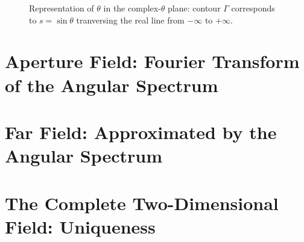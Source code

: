 \begin{figure}[htbp]
	\begin{center}
	\end{center}
	\caption{Representation of $\theta$ in the complex-$\theta$ plane: contour $\Gamma$ corresponds to $s=\sin\theta$ tranversing the real line from $-\infty$ to $+\infty$.}
	\label{fig:cplxt}
\end{figure}


\section{Aperture Field: Fourier Transform of the Angular Spectrum}

\section{Far Field: Approximated by the Angular Spectrum}

\section{The Complete Two-Dimensional Field: Uniqueness}











